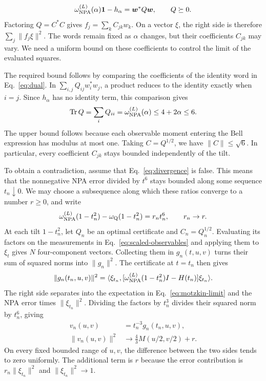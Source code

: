 \documentclass[aps,prl,twocolumn,10pt,superscriptaddress,nofootinbib,longbibliography,nobalancelastpage]{revtex4-2}
\newcommand{\id}{\mathbf 1}
\newcommand{\Tr}{\operatorname{Tr}}
\begin{document}
\begin{equation}
\omega_{\rm NPA}^{(L)}(\alpha)\id-h_\alpha=\bm w^*Q\bm w,\qquad Q\succeq0.
\label{eq:dual}
\end{equation}
Factoring $Q=C^*C$ gives $f_j=\sum_kC_{jk}w_k$. On a vector $\xi$, the right side is therefore $\sum_j\|f_j\xi\|^2$. The words remain fixed as $\alpha$ changes, but their coefficients $C_{jk}$ may vary. We need a uniform bound on these coefficients to control the limit of the evaluated squares.

The required bound follows by comparing the coefficients of the identity word in Eq.~\eqref{eq:dual}. In $\sum_{i,j}Q_{ij}w_i^*w_j$, a product reduces to the identity exactly when $i=j$. Since $h_\alpha$ has no identity term, this comparison gives
\begin{equation}
\Tr Q=\sum_iQ_{ii}=\omega_{\rm NPA}^{(L)}(\alpha)\leq4+2\alpha\leq6.
\label{eq:trace}
\end{equation}
The upper bound follows because each observable moment entering the Bell expression has modulus at most one. Taking $C=Q^{1/2}$, we have $\|C\|\leq\sqrt6$. In particular, every coefficient $C_{jk}$ stays bounded independently of the tilt.

To obtain a contradiction, assume that Eq.~\eqref{eq:divergence} is false. This means that the nonnegative NPA error divided by $t^6$ stays bounded along some sequence $t_n\downarrow0$. We may choose a subsequence along which these ratios converge to a number $r\geq0$, and write
\begin{equation}
\omega_{\rm NPA}^{(L)}(1-t_n^2)-\omega_{\rm Q}(1-t_n^2)=r_nt_n^6,
\qquad r_n\to r.
\label{eq:bounded-excess}
\end{equation}
At each tilt $1-t_n^2$, let $Q_n$ be an optimal certificate and $C_n=Q_n^{1/2}$. Evaluating its factors on the measurements in Eq.~\eqref{eq:scaled-observables} and applying them to $\xi_t$ gives $N$ four-component vectors. Collecting them in $g_n(t,u,v)$ turns their sum of squared norms into $\|g_n\|^2$. The certificate at $t=t_n$ then gives
\[
\|g_n(t_n,u,v)\|^2
=\langle\xi_{t_n},[\omega_{\rm NPA}^{(L)}(1-t_n^2)I-H(t_n)]\xi_{t_n}\rangle.
\]
The right side separates into the expectation in Eq.~\eqref{eq:motzkin-limit} and the NPA error times $\|\xi_{t_n}\|^2$. Dividing the factors by $t_n^3$ divides their squared norm by $t_n^6$, giving
\begin{align}
v_n(u,v)&=t_n^{-3}g_n(t_n,u,v),\nonumber\\
\|v_n(u,v)\|^2&\longrightarrow\tfrac43M(u/2,v/2)+r.
\label{eq:certificate-limit}
\end{align}
On every fixed bounded range of $u,v$, the difference between the two sides tends to zero uniformly. The additional term is $r$ because the error contribution is $r_n\|\xi_{t_n}\|^2$ and $\|\xi_{t_n}\|^2\to1$.
\end{document}
